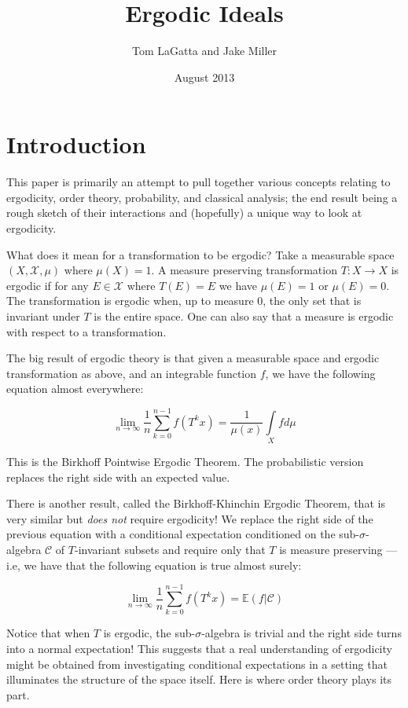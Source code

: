 \documentclass[letterpaper,10pt,oneside,onecolumn,reqno]{amsart}
\author{Tom LaGatta and Jake Miller}
\title{Ergodic Ideals}
\date{August 2013}
\newcommand{\C}{\mathcal C}
\newcommand{\E}{\mathbb E}
\newcommand{\X}{\mathcal X}
\theoremstyle{definition}
\begin{document}
\maketitle

\part{Introduction}

This paper is primarily an attempt to pull together various concepts
relating to ergodicity, order theory, probability, and classical
analysis; the end result being a rough sketch of their interactions
and (hopefully) a unique way to look at ergodicity.

What does it mean for a transformation to be ergodic? Take a
measurable space $(X,\X,\mu)$ where $\mu(X) = 1 $. A measure
preserving transformation $T : X \to X$ is ergodic if for any $E \in
\X$ where $T(E) = E$ we have $\mu(E) = 1$ or $\mu(E) = 0$. The
transformation is ergodic when, up to measure 0, the only set that is
invariant under $T$ is the entire space. One can also say that a
measure is ergodic with respect to a transformation.

The big result of ergodic theory is that given a measurable space and
ergodic transformation as above, and an integrable function $f$, we
have the following equation almost everywhere:

\begin{equation}
  \label{eq:1}
  \lim_{n \to \infty}\frac{1}{n} \sum\limits_{k=0}^{n-1}f(T^k x) =
  \frac{1}{\mu(x)}\int\limits_X fd\mu
\end{equation}

This is the Birkhoff Pointwise Ergodic Theorem. The probabilistic
version replaces the right side with an expected value.

There is another result, called the Birkhoff-Khinchin Ergodic Theorem,
that is very similar but \emph{does not} require ergodicity!  We
replace the right side of the previous equation with a conditional
expectation conditioned on the sub-$\sigma$-algebra $\C$ of
$T$-invariant subsets and require only that $T$ is measure preserving
--- i.e, we have that the following equation is true almost surely:

\begin{equation}
  \label{eq:2}
  \lim_{n \to \infty}\frac{1}{n} \sum\limits_{k=0}^{n-1}f(T^k x) =
  \E(f | \C)
\end{equation}

Notice that when $T$ is ergodic, the sub-$\sigma$-algebra is trivial
and the right side turns into a normal expectation! This suggests that
a real understanding of ergodicity might be obtained from
investigating conditional expectations in a setting that illuminates
the structure of the space itself. Here is where order theory plays
its part.
\end{document}
